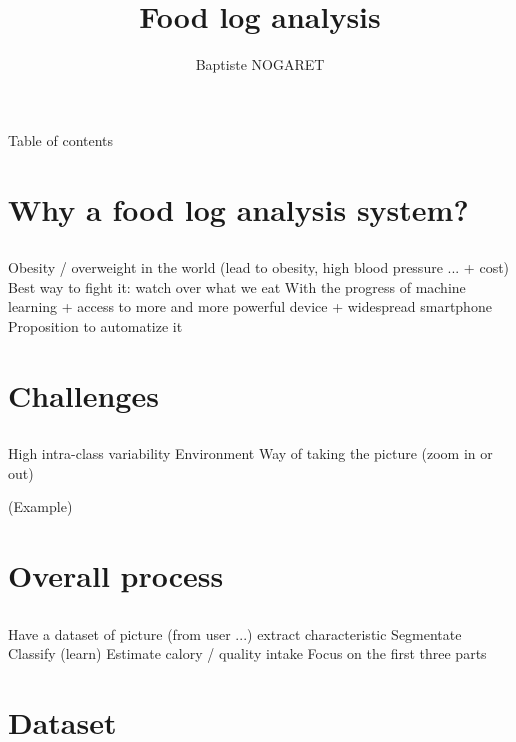 \documentclass[aspectratio=169]{beamer}
\author{Baptiste NOGARET}
\title{Food log analysis}
\let\oldsection\section
\renewcommand{\section}[1]{
    \oldsection{#1}	
    \subsection{}
}
\newenvironment{myframe}[1][t]{\begin{frame}[#1]{\secname}{\subsecname}}{\end{frame}}
\begin{document}
	
	\begin{frame}[plain]
		\titlepage
	\end{frame}
    
    \begin{frame}{Table of contents}
        \begin{multicols}{2}
            \tableofcontents
        \end{multicols}
    \end{frame}
    
    \section{Why a food log analysis system?}
    
	\begin{myframe}
        Obesity / overweight in the world (lead to obesity, high blood pressure ... + cost)
        Best way to fight it: watch over what we eat
        With the progress of machine learning + access to more and more powerful device + widespread smartphone
        Proposition to automatize it
	\end{myframe}
    
    \section{Challenges}
    
    \begin{myframe}
        High intra-class variability
        Environment
        Way of taking the picture (zoom in or out)
        
        (Example)
    \end{myframe}
    
    \section{Overall process}
    
    \begin{myframe}
        Have a dataset of picture (from user ...)
        extract characteristic
        Segmentate
        Classify (learn)
        Estimate calory / quality intake
        Focus on the first three parts
    \end{myframe}
    
    \section{Dataset}
    
\end{document}
